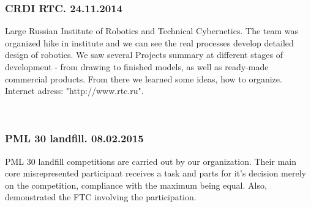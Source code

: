 	\subsubsection{CRDI RTC. 24.11.2014}
	Large Russian Institute of Robotics and Technical Cybernetics. The team was organized hike in institute and we can see the real processes develop detailed design of robotics. We saw several Projects summary at different stages of development - from drawing to finished models, as well as ready-made commercial products. From there we learned some ideas, how to organize. Internet adress: "http://www.rtc.ru".
	\begin{figure}[H]	
		\\
	\end{figure}
	\subsubsection{PML 30 landfill. 08.02.2015}	
	PML 30 landfill competitions are carried out by our organization. Their main core misrepresented participant receives a task and parts for it's decision merely on the competition, compliance with the maximum being equal. Also, demonstrated the FTC involving the participation.
	\begin{figure}[H]
		\\
    \end{figure}
